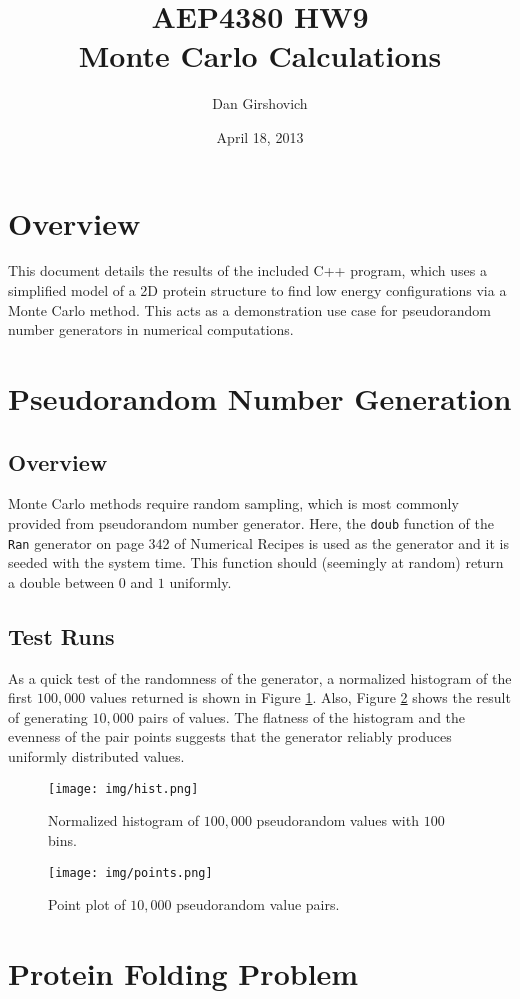 \documentclass[12pt]{article}
\title{AEP4380 HW9 \\ Monte Carlo Calculations }
\author{Dan Girshovich}
\date{April 18, 2013}
\begin{document}
\maketitle
\section{Overview}
This document details the results of the included C++ program, which uses a simplified model of a 2D protein structure to find low energy configurations via a Monte Carlo method. This acts as a demonstration use case for pseudorandom number generators in numerical computations.
\section{Pseudorandom Number Generation}
\subsection{Overview}
Monte Carlo methods require random sampling, which is most commonly provided from pseudorandom number generator. Here, the \texttt{doub} function of the \texttt{Ran} generator on page 342 of Numerical Recipes \cite{numericalrecipes} is used as the generator and it is seeded with the system time. This function should (seemingly at random) return a double between $0$ and $1$ uniformly.
\subsection{Test Runs}
As a quick test of the randomness of the generator, a normalized histogram of the first $100,000$ values returned is shown in Figure \ref{f1}. Also, Figure \ref{f2} shows the result of generating $10,000$ pairs of values. The flatness of the histogram and the evenness of the pair points suggests that the generator reliably produces uniformly distributed values.
\begin{figure}
  \centering
  \texttt{[image: img/hist.png]}
  \caption{Normalized histogram of $100,000$ pseudorandom values with $100$ bins.}
  \label{f1}
\end{figure}
\begin{figure}
  \centering
  \texttt{[image: img/points.png]}
  \caption{Point plot of $10,000$ pseudorandom value pairs.}
  \label{f2}
\end{figure}
\section{Protein Folding Problem}
\end{document}
